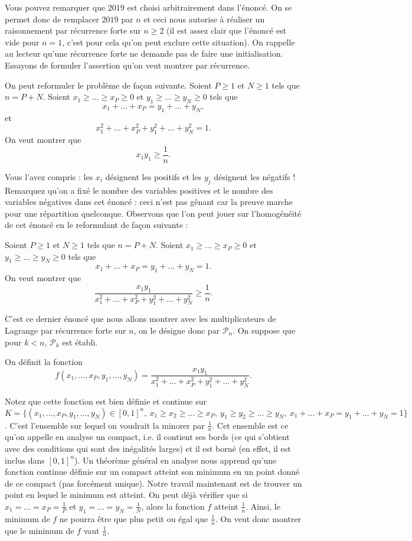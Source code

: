\begin{sol}
Vous pouvez remarquer que $2019$ est choisi arbitrairement dans l'énoncé. On se permet donc de remplacer $2019$ par $n$ et ceci nous autorise à réaliser un raisonnement par récurrence forte sur $n \geq 2$ (il est assez clair que l'énoncé est vide pour $n=1$, c'est pour cela qu'on peut exclure cette situation). On rappelle au lecteur qu'une récurrence forte ne demande pas de faire une initialisation. Essayons de formuler l'assertion qu'on veut montrer par récurrence.

On peut reformuler le problème de façon suivante. Soient $P \geq 1$ et $N \geq 1$ tels que $n=P+N$. Soient $x_1\geq\dots\geq x_P \geq 0$ et $y_1 \geq \dots\geq y_N \geq 0$ tels que
\[
x_1 + \dots + x_P = y_1 + \dots + y_N,
\]
et
\[
x_1^2 + \dots + x_P^2 + y_1^2 + \dots + y_N^2 = 1.
\]
On veut montrer que
\[
x_1 y_1 \geq \frac1{n}.
\]

Vous l'avez compris : les $x_i$ désignent les positifs et les $y_j$ désignent les négatifs ! Remarquez qu'on a fixé le nombre des variables positives et le nombre des variables négatives dans cet énoncé : ceci n'est pas gênant car la preuve marche pour une répartition quelconque. Observons que l'on peut jouer sur l'homogénéité de cet énoncé en le reformulant de façon suivante :

Soient $P \geq 1$ et $N \geq 1$ tels que $n=P+N$. Soient $x_1\geq\dots\geq x_P \geq 0$ et $y_1 \geq \dots\geq y_N \geq 0$ tels que
\[
x_1 + \dots + x_P = y_1 + \dots + y_N = 1.
\]
On veut montrer que
\[
\frac{x_1 y_1}{x_1^2 + \dots + x_P^2 + y_1^2 + \dots + y_N^2} \geq \frac1{n}.
\]

C'est ce dernier énoncé que nous allons montrer avec les multiplicateurs de Lagrange par récurrence forte sur $n$, on le désigne donc par $\mathcal{P}_n$. On suppose que pour $k<n$, $\mathcal{P}_k$ est établi.

On définit la fonction
\[
f(x_1,\dots,x_P,y_1,\dots,y_N)=\frac{x_1 y_1}{x_1^2 + \dots + x_P^2 + y_1^2 + \dots + y_N^2}.
\]

Notez que cette fonction est bien définie et continue sur $K=\{(x_1,\dots,x_P,y_1,\dots,y_N) \in [0,1]^{n},\ x_1 \geq x_2 \geq \dots \geq x_P,\ y_1 \geq y_2 \geq \dots \geq y_N,\ x_1 + \dots + x_P = y_1 + \dots + y_N = 1 \}$. C'est l'ensemble sur lequel on voudrait la minorer par $\frac1{n}$. Cet ensemble est ce qu'on appelle en analyse un compact, i.e. il contient ses bords (ce qui s'obtient avec des conditions qui sont des inégalités larges) et il est borné (en effet, il est inclus dans $[0,1]^{n}$). Un théorème général en analyse nous apprend qu'une fonction continue définie sur un compact atteint son minimum en un point donné de ce compact (pas forcément unique). Notre travail maintenant est de trouver un point en lequel le minimum est atteint. On peut déjà vérifier que si $x_1 = \dots = x_P = \frac1{P}$ et $y_1 = \dots =y_N = \frac1{N}$, alors la fonction $f$ atteint $\frac1{n}$. Ainsi, le minimum de $f$ ne pourra être que plus petit ou égal que $\frac1{n}$. On veut donc montrer que le minimum de $f$ vaut $\frac1{n}$.


\end{sol}
